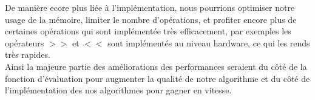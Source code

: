 \documentclass{article}
\begin{document}
De manière ecore plus liée à l'implémentation, nous pourrions optimiser notre usage de la mémoire, limiter le nombre d'opérations, et profiter encore plus
de certaines opérations qui sont implémentée très efficacement, par exemples les opérateurs $>>$ et $<<$ sont implémentés au niveau hardware, ce qui les
rends très rapides.\\

Ainsi la majeure partie des améliorations des performances seraient du côté de la fonction d'évaluation pour augmenter la qualité de notre algorithme
et du côté de l'implémentation des nos algorithmes pour gagner en vitesse.
\pagebreak
\end{document}
